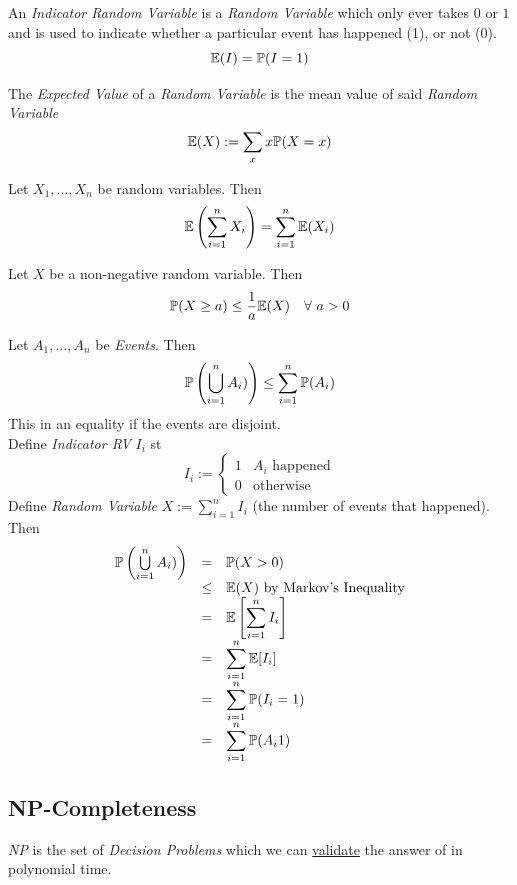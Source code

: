 \documentclass[11pt,a4paper]{article}
\begin{document}
An \textit{Indicator Random Variable} is a \textit{Random Variable} which only ever takes $0$ or $1$ and is used to indicate whether a particular event has happened (1), or not (0).
$$\mathbb{E}(I)=\mathbb{P}(I=1)$$

The \textit{Expected Value} of a \textit{Random Variable} is the mean value of said \textit{Random Variable}
$$\mathbb{E}(X):=\sum_x x\mathbb{P}(X=x)$$

Let $X_1,\dots,X_n$ be random variables. Then
$$\mathbb{E}\left(\sum_{i=1}^nX_i\right)=\sum_{i=1}^n\mathbb{E}(X_i)$$

Let $X$ be a non-negative random variable. Then
$$\prob(X\geq a)\leq\frac1a\expect(X)\quad\forall\ a>0$$

Let $A_1,\dots,A_n$ be \textit{Events}. Then
$$\mathbb{P}\left(\bigcup\limits_{i=1}^nA_i)\right)\leq\sum_{i=1}^n\mathbb{P}(A_i)$$
\nb This in an equality if the events are disjoint.\\

Define \textit{Indicator RV} $I_i$ st
$$I_i:=\begin{cases}1&A_i\text{ happened}\\0&\text{otherwise}\end{cases}$$
Define \textit{Random Variable} $X:=\sum_{i=1}^nI_i$ (the number of events that happened).\\
Then
\[\begin{array}{rcl}
\mathbb{P}\left(\bigcup\limits_{i=1}^nA_i)\right)&=&\mathbb{P}(X>0)\\
&\leq&\mathbb{E}(X)\text{ by Markov's Inequality}\\
&=&\mathbb{E}\left[\displaystyle\sum_{i=1}^nI_i\right]\\
&=&\displaystyle\sum_{i=1}^n\mathbb{E}[I_i]\\
&=&\displaystyle\sum_{i=1}^n\mathbb{P}(I_i=1)\\
&=&\displaystyle\sum_{i=1}^n\mathbb{P}(A_i1)
\end{array}\]
\proved

\subsection{NP-Completeness}

\textit{NP} is the set of \textit{Decision Problems} which we can \underline{validate} the answer of in polynomial time.\\
\end{document}
